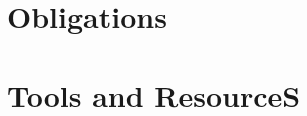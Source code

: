 \documentclass{article}
\begin{document}
\newcommand{\niha}[1]{\textcolor{blue}{Niha: #1}}
\newcommand{\cassie}[1]{\textcolor{cyan}{Cassie: #1}}
\newcommand{\alexandra}[1]{\textcolor{green}{Alexandra: #1}}
\newcommand{\emma}[1]{\textcolor{yellow}{Emma: #1}}

\newcommand{\gwis}[0]{GWiS}














\section{Obligations}
\label{sec:obligations}


\section{Tools and ResourceS}

\end{document}
